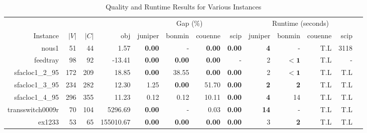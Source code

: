 \begin{landscape} 
\begin{table*}[t] 
\footnotesize 
\caption{Quality and Runtime Results for Various Instances} 
\begin{tabular}{|r|r|r||r||r|r|r|r||r|r|r|r|r|} 
\hline 
                        &     &       &             & \multicolumn{4}{c||}{Gap (\%)} &  \multicolumn{4}{c|}{Runtime (seconds)} \\ 
    Instance              & $|V|$& $|C|$& obj         & juniper    & bonmin & couenne        & scip            & juniper          & bonmin            & couenne         & scip \\ 
    \hline 
    \hline 
                               nous1 &            51 &            44 &                              1.57 &  \textbf{0.00} &              - &  \textbf{0.00} &  \textbf{0.00} &         \textbf{4} &                  - &                T.L &               3118 \\ 
                            feedtray &            98 &            92 &                            -13.41 &  \textbf{0.00} &  \textbf{0.00} &  \textbf{0.00} &              - &                  2 &         $\bm{< 1}$ &                T.L &                  - \\ 
                     sfacloc1\_2\_95 &           172 &           209 &                             18.85 &  \textbf{0.00} &          38.55 &  \textbf{0.00} &  \textbf{0.00} &                  2 &         $\bm{< 1}$ &                T.L &                T.L \\ 
                     sfacloc1\_3\_95 &           234 &           282 &                             12.30 &           1.25 &  \textbf{0.00} &          51.70 &  \textbf{0.00} &         \textbf{2} &         \textbf{2} &                T.L &                T.L \\ 
                     sfacloc1\_4\_95 &           296 &           355 &                             11.23 &           0.12 &           0.12 &          10.11 &  \textbf{0.00} &         \textbf{4} &                 14 &                T.L &                T.L \\ 
                    transswitch0009r &            70 &           104 &                           5296.69 &  \textbf{0.00} &              - &           0.03 &  \textbf{0.00} &        \textbf{14} &                  - &                T.L &                T.L \\ 
                              ex1233 &            53 &            65 &                         155010.67 &  \textbf{0.00} &  \textbf{0.00} &  \textbf{0.00} &  \textbf{0.00} &                  3 &         \textbf{2} &                T.L &                T.L \\ 

\end{tabular}
\end{table*}
\end{landscape}
